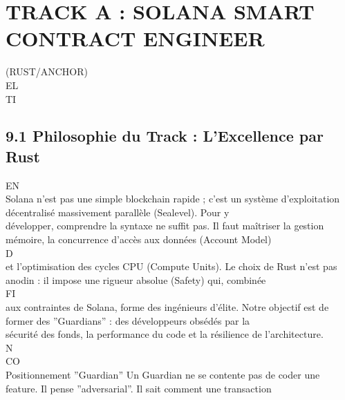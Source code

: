 \section{TRACK A : SOLANA SMART CONTRACT ENGINEER}
(RUST/ANCHOR)\\
\vspace{0.5em}
\vspace{0.5em}
\vspace{0.5em}
\vspace{0.5em}
EL\\
TI\\
\subsection{9.1 Philosophie du Track : L’Excellence par Rust}
\vspace{0.5em}
\vspace{0.5em}
\vspace{0.5em}
\vspace{0.5em}
EN\\
Solana n’est pas une simple blockchain rapide ; c’est un système d’exploitation décentralisé massivement parallèle (Sealevel). Pour y\\
développer, comprendre la syntaxe ne suffit pas. Il faut maîtriser la gestion mémoire, la concurrence d’accès aux données (Account Model)\\
\vspace{0.5em}
\vspace{0.5em}
\vspace{0.5em}
\vspace{0.5em}
D\\
et l’optimisation des cycles CPU (Compute Units). Le choix de Rust n’est pas anodin : il impose une rigueur absolue (Safety) qui, combinée\\
\vspace{0.5em}
\vspace{0.5em}
\vspace{0.5em}
\vspace{0.5em}
FI\\
aux contraintes de Solana, forme des ingénieurs d’élite. Notre objectif est de former des ”Guardians” : des développeurs obsédés par la\\
sécurité des fonds, la performance du code et la résilience de l’architecture.\\
N\\
CO\\
Positionnement ”Guardian” Un Guardian ne se contente pas de coder une feature. Il pense ”adversarial”. Il sait comment une transaction\\
